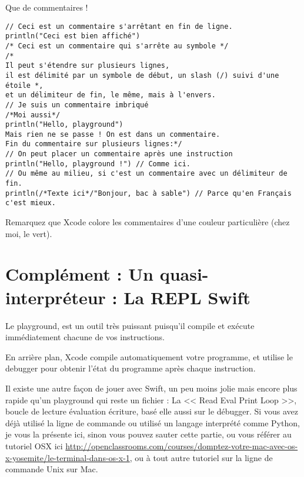 \begin{listing}[h]
\caption{Que de commentaires !}
\begin{verbatim}
// Ceci est un commentaire s'arrêtant en fin de ligne.
println("Ceci est bien affiché")
/* Ceci est un commentaire qui s'arrête au symbole */
/*
Il peut s'étendre sur plusieurs lignes,
il est délimité par un symbole de début, un slash (/) suivi d'une étoile *,
et un délimiteur de fin, le même, mais à l'envers.
// Je suis un commentaire imbriqué
/*Moi aussi*/
println("Hello, playground")
Mais rien ne se passe ! On est dans un commentaire.
Fin du commentaire sur plusieurs lignes:*/
// On peut placer un commentaire après une instruction
println("Hello, playground !") // Comme ici.
// Ou même au milieu, si c'est un commentaire avec un délimiteur de fin.
println(/*Texte ici*/"Bonjour, bac à sable") // Parce qu'en Français c'est mieux.
\end{verbatim}
\end{listing}
Remarquez que Xcode colore les commentaires d'une couleur particulière (chez moi, le vert).

\section{Complément : Un quasi-interpréteur : La REPL Swift}
Le playground, est un outil très puissant
puisqu’il compile et exécute immédiatement
chacune de vos instructions.

En arrière plan, Xcode compile automatiquement votre programme,
et utilise le debugger pour obtenir l’état du programme après chaque instruction.

Il existe une autre façon de jouer avec Swift,
un peu moins jolie mais encore plus rapide qu’un playground
qui reste un fichier :
La << Read Eval Print Loop >>, boucle de lecture évaluation écriture,
basé elle aussi sur le débugger.
Si vous avez déjà utilisé la ligne de commande
ou utilisé un langage interprété comme Python,
je vous la présente ici, sinon vous pouvez sauter cette partie,
ou vous référer au tutoriel OSX ici \url{http://openclassrooms.com/courses/domptez-votre-mac-avec-os-x-yosemite/le-terminal-dans-os-x-1},
ou à tout autre tutoriel sur la ligne de commande Unix sur Mac.

